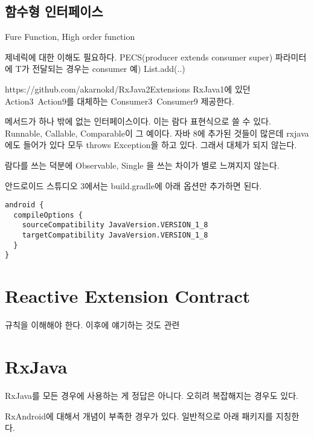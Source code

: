 \documentclass{book}
\begin{document}
\subsection{함수형 인터페이스}
Fure Function, High order function


제네릭에 대한 이해도 필요하다.
PECS(producer extends consumer super)
파라미터에 T가 전달되는 경우는 consumer
예) List.add(..)


https://github.com/akarnokd/RxJava2Extensions
RxJava1에 있던 Action3~Action9를 대체하는 Consumer3~Consumer9  제공한다.

메서드가 하나 밖에 없는 인터페이스이다.
이는 람다 표현식으로 쓸 수 있다.
Runnable, Callable, Comparable이 그 예이다.
자바 8에 추가된 것들이 많은데 rxjava에도 들어가 있다
모두 throws Exception을 하고 있다. 그래서 대체가 되지 않는다.

람다를 쓰는 덕분에 Observable, Single 을 쓰는 차이가 별로 느껴지지 않는다.


안드로이드 스튜디오 3에서는 build.gradle에 아래 옵션만 추가하면 된다.
\begin{verbatim}
android {
  compileOptions {
    sourceCompatibility JavaVersion.VERSION_1_8
    targetCompatibility JavaVersion.VERSION_1_8
  }
}
\end{verbatim}

\begin{comment}
Java8을 지원하면 내용이 제거되니 지금은 대강만 쓰자.
자바 8부터 지원하는 람다식을 쓸 수 있다.
안드로이드 스튜디오에서 사용방법은 https://github.com/evant/gradle-retrolambda를 참고하자.
\end{comment}

\section{Reactive Extension Contract}
규칙을 이해해야 한다. 이후에 얘기하는 것도 관련

\section{RxJava}
RxJava를 모든 경우에 사용하는 게 정답은 아니다.
오히려 복잡해지는 경우도 있다.

RxAndroid에 대해서 개념이 부족한 경우가 있다. 일반적으로 아래 패키지를 지칭한다.
\end{document}
